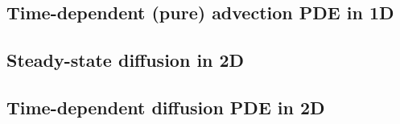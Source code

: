 





































































\newpage
\subsection{Time-dependent (pure) advection PDE in 1D}


\subsection{Steady-state diffusion in 2D}

\subsection{Time-dependent diffusion PDE in 2D}






%


